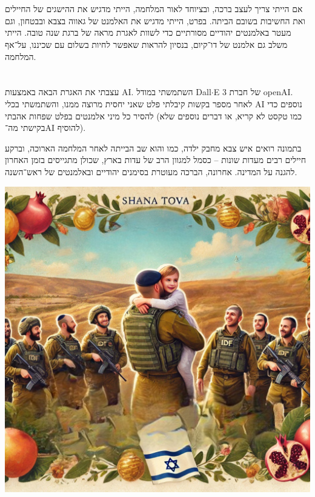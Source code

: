 \documentclass[]{article}
\begin{document}
	\section{}
	אם הייתי צריך לעצב ברכה, ובציוחד לאור המלחמה, הייתי מדגיש את ההישגים של החיילים ואת החשיבות בשובם הביתה. בפרט, הייתי מדגיש את האלמנט של גאווה בצבא ובבטחון, וגם מעטר באלמנטים יהודיים מסורתיים כדי לשוות לאגרת מראה של ברגת שנה טובה. הייתי משלב גם אלמנט של דו־קיום, בנסיון להראות שאפשר לחיות בשלום עם שכיננו, על־אף המלחמה. 
	
	\section{}
	עצבתי את האגרת הבאה באמצעות AI. השתמשתי במודל Dall$\cdot$E 3 של חברת openAI. לאחר מספר בקשות קיבלתי פלט שאני יחסית מרוצה ממנו, והשתמשתי בכלי AI נוספים כדי להסיר כל מיני אלמנטים בפלט שפחות אהבתי (כמו טקסט לא קריא, או דברים נוספים שלא בקישתי מה־AI להוסיף).
	
	בתמונה רואים איש צבא מחבק ילדה, כמו והוא שב הבייתה לאחר המלחמה הארוכה, וברקע חיילים רבים מעדות שונות – כסמל למגוון הרב של עדות בארץ, שכולן מתגייסים בזמן האחרון להגנה על המדינה. אחרונה, הברכה מעוטרת בסימנים יהודיים ובאלמנטים של ראש־השנה. 
	
	\begin{center}
		\includegraphics[scale=0.17]{his.png}
	\end{center}
\end{document}
